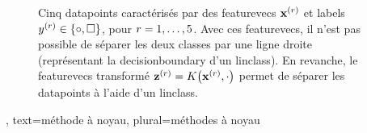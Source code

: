 {{\begin{figure}[H]
\begin{center}
		\end{center}
		\caption{
			Cinq \glspl{datapoint} caractérisés par des \glspl{featurevec} ${\bf x}^{(r)}$ 
			et \glspl{label} $y^{(r)} \in \{ \circ, \square \}$, pour $r=1, \ldots, 5$. 
			Avec ces \glspl{featurevec}, il n'est pas possible de séparer les deux classes par une ligne droite (représentant la \gls{decisionboundary} d'un \gls{linclass}). En revanche, le \glspl{featurevec} transformé ${\bf z}^{(r)} = K\big({\bf x}^{(r)},\cdot\big)$ permet de séparer les \glspl{datapoint} à l'aide d'un \gls{linclass}.  \label{fig_linsep_kernel_dict}}
	\end{figure}
	},
	text={méthode à noyau}, plural={méthodes à noyau}
}

